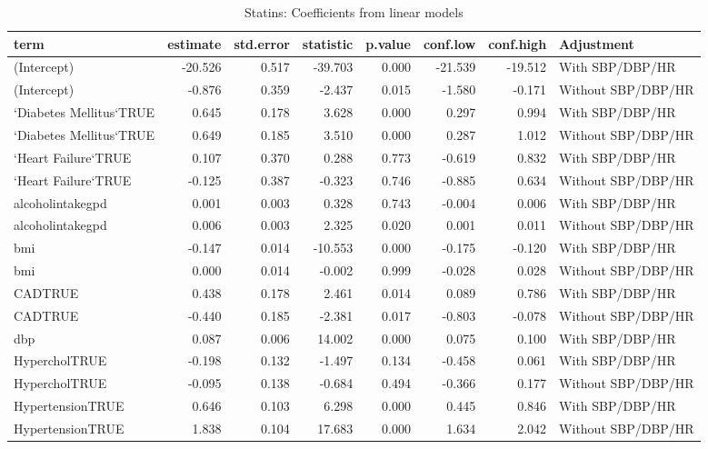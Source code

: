 \documentclass[
]{article}
\begin{document}
\begin{table}

\caption{\label{tab:statin-fit-table}Statins: Coefficients from linear models}
\centering
\begin{tabular}[t]{l|r|r|r|r|r|r|l}
\hline
term & estimate & std.error & statistic & p.value & conf.low & conf.high & Adjustment\\
\hline
(Intercept) & -20.526 & 0.517 & -39.703 & 0.000 & -21.539 & -19.512 & With SBP/DBP/HR\\
\hline
(Intercept) & -0.876 & 0.359 & -2.437 & 0.015 & -1.580 & -0.171 & Without SBP/DBP/HR\\
\hline
`Diabetes Mellitus`TRUE & 0.645 & 0.178 & 3.628 & 0.000 & 0.297 & 0.994 & With SBP/DBP/HR\\
\hline
`Diabetes Mellitus`TRUE & 0.649 & 0.185 & 3.510 & 0.000 & 0.287 & 1.012 & Without SBP/DBP/HR\\
\hline
`Heart Failure`TRUE & 0.107 & 0.370 & 0.288 & 0.773 & -0.619 & 0.832 & With SBP/DBP/HR\\
\hline
`Heart Failure`TRUE & -0.125 & 0.387 & -0.323 & 0.746 & -0.885 & 0.634 & Without SBP/DBP/HR\\
\hline
alcoholintakegpd & 0.001 & 0.003 & 0.328 & 0.743 & -0.004 & 0.006 & With SBP/DBP/HR\\
\hline
alcoholintakegpd & 0.006 & 0.003 & 2.325 & 0.020 & 0.001 & 0.011 & Without SBP/DBP/HR\\
\hline
bmi & -0.147 & 0.014 & -10.553 & 0.000 & -0.175 & -0.120 & With SBP/DBP/HR\\
\hline
bmi & 0.000 & 0.014 & -0.002 & 0.999 & -0.028 & 0.028 & Without SBP/DBP/HR\\
\hline
CADTRUE & 0.438 & 0.178 & 2.461 & 0.014 & 0.089 & 0.786 & With SBP/DBP/HR\\
\hline
CADTRUE & -0.440 & 0.185 & -2.381 & 0.017 & -0.803 & -0.078 & Without SBP/DBP/HR\\
\hline
dbp & 0.087 & 0.006 & 14.002 & 0.000 & 0.075 & 0.100 & With SBP/DBP/HR\\
\hline
HypercholTRUE & -0.198 & 0.132 & -1.497 & 0.134 & -0.458 & 0.061 & With SBP/DBP/HR\\
\hline
HypercholTRUE & -0.095 & 0.138 & -0.684 & 0.494 & -0.366 & 0.177 & Without SBP/DBP/HR\\
\hline
HypertensionTRUE & 0.646 & 0.103 & 6.298 & 0.000 & 0.445 & 0.846 & With SBP/DBP/HR\\
\hline
HypertensionTRUE & 1.838 & 0.104 & 17.683 & 0.000 & 1.634 & 2.042 & Without SBP/DBP/HR\\

\end{tabular}
\end{table}
\end{document}
